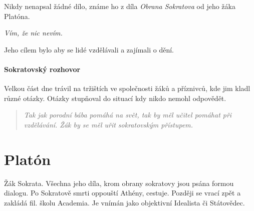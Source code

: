 \documentclass[10pt,a4paper,
twoside,%
]{report}
\begin{document}
Nikdy nenapsal žádné dílo, známe ho z díla \emph{Obrana Sokratova} od jeho žáka Platóna.
\begin{large}
\begin{center}

\emph{Vím, že nic nevím.}
\end{center}
\end{large}

Jeho cílem bylo aby se lidé vzdělávali a zajímali o dění.

\paragraph{Sokratovský rozhovor} Velkou část dne trávil na tržištích ve společnosti žáků a příznivců, kde jim kladl různé otázky. Otázky stupňoval do situací kdy nikdo nemohl odpovědět. 
 
 \begin{quote}
 \emph{
Tak jak porodní bába pomáhá na svět, tak by měl učitel pomáhat při vzdělávání. Žák by se měl uřit sokratovským přístupem.
}\end{quote}
 
 \section{Platón}
 
 Žák Sokrata. Všechna jeho díla, krom obrany sokratovy jsou psána formou dialogu. Po Sokratově smrti oppouští Athény, cestuje. Později se vrací zpět a zakládá fil. školu Academia. Je vnímán jako objektivní Idealista či Státovědec.
 
\end{document}
